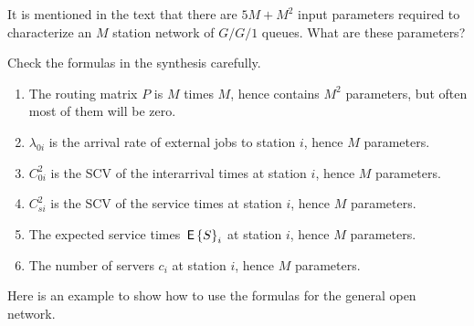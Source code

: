 \begin{exercise}
  It is mentioned in the text that there are $5M+M^2$ input parameters
  required to characterize an $M$ station network of $G/G/1$ queues. What are these parameters?
  \begin{hint}
 Check the formulas in the synthesis carefully.
  \end{hint}
  \begin{solution}
    \begin{enumerate}
    \item The routing matrix $P$ is $M$ times $M$, hence contains
      $M^2$ parameters, but often most of them will be zero.
    \item $\lambda_{0i}$ is the arrival rate of external jobs to station $i$, hence $M$ parameters.
    \item $C_{0i}^2$ is the SCV of the interarrival times at station
      $i$, hence $M$ parameters.
    \item $C_{si}^2$ is the SCV of the service times at station $i$,
      hence $M$ parameters.
    \item The expected service times $\,\mathsf{E}\left\{S\right\}_i$ at station $i$, 
      hence $M$ parameters.
    \item The number of servers $c_i$ at station $i$, hence $M$
      parameters.
    \end{enumerate}
  \end{solution}
\end{exercise}


Here is an example to show how to use the formulas for the general open network.

